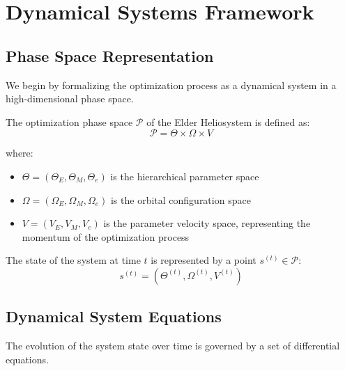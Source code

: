 \section{Dynamical Systems Framework}

\subsection{Phase Space Representation}

We begin by formalizing the optimization process as a dynamical system in a high-dimensional phase space.

\begin{definition}
The optimization phase space $\mathcal{P}$ of the Elder Heliosystem is defined as:
\begin{equation}
\mathcal{P} = \Theta \times \Omega \times V
\end{equation}

where:
\begin{itemize}
    \item $\Theta = (\Theta_E, \Theta_M, \Theta_e)$ is the hierarchical parameter space
    \item $\Omega = (\Omega_E, \Omega_M, \Omega_e)$ is the orbital configuration space
    \item $V = (V_E, V_M, V_e)$ is the parameter velocity space, representing the momentum of the optimization process
\end{itemize}
\end{definition}

\begin{definition}
The state of the system at time $t$ is represented by a point $s^{(t)} \in \mathcal{P}$:
\begin{equation}
s^{(t)} = (\Theta^{(t)}, \Omega^{(t)}, V^{(t)})
\end{equation}
\end{definition}

\subsection{Dynamical System Equations}

The evolution of the system state over time is governed by a set of differential equations.

